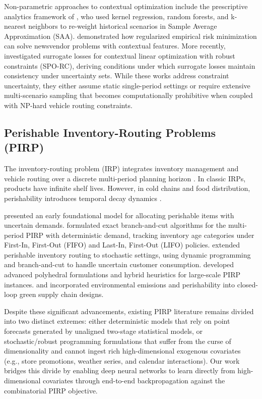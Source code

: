\documentclass[11pt,a4paper]{article}
\theoremstyle{definition}
\theoremstyle{remark}
\begin{document}
Non-parametric approaches to contextual optimization include the prescriptive analytics framework of \citet{bertsimas2020predictive}, who used kernel regression, random forests, and k-nearest neighbors to re-weight historical scenarios in Sample Average Approximation (SAA). \citet{ban2019big} demonstrated how regularized empirical risk minimization can solve newsvendor problems with contextual features. More recently, \citet{im2025smart} investigated surrogate losses for contextual linear optimization with robust constraints (SPO-RC), deriving conditions under which surrogate losses maintain consistency under uncertainty sets. While these works address constraint uncertainty, they either assume static single-period settings or require extensive multi-scenario sampling that becomes computationally prohibitive when coupled with NP-hard vehicle routing constraints.

\subsection{Perishable Inventory-Routing Problems (PIRP)}
The inventory-routing problem (IRP) integrates inventory management and vehicle routing over a discrete multi-period planning horizon \citep{federgruen1984combined,coelho2014thirty}. In classic IRPs, products have infinite shelf lives. However, in cold chains and food distribution, perishability introduces temporal decay dynamics \citep{nahmias1982perishable,amorim2014rich}.

\citet{federgruen1986allocation} presented an early foundational model for allocating perishable items with uncertain demands. \citet{coelho2014optimal} formulated exact branch-and-cut algorithms for the multi-period PIRP with deterministic demand, tracking inventory age categories under First-In, First-Out (FIFO) and Last-In, First-Out (LIFO) policies. \citet{archetti2018stochastic} extended perishable inventory routing to stochastic settings, using dynamic programming and branch-and-cut to handle uncertain customer consumption. \citet{alvarez2020formulations} developed advanced polyhedral formulations and hybrid heuristics for large-scale PIRP instances. \citet{soysal2015modeling} and \citet{liu2021sustainable} incorporated environmental emissions and perishability into closed-loop green supply chain designs.

Despite these significant advancements, existing PIRP literature remains divided into two distinct extremes: either deterministic models that rely on point forecasts generated by unaligned two-stage statistical models, or stochastic/robust programming formulations that suffer from the curse of dimensionality and cannot ingest rich high-dimensional exogenous covariates (e.g., store promotions, weather series, and calendar interactions). Our work bridges this divide by enabling deep neural networks to learn directly from high-dimensional covariates through end-to-end backpropagation against the combinatorial PIRP objective.
\end{document}
